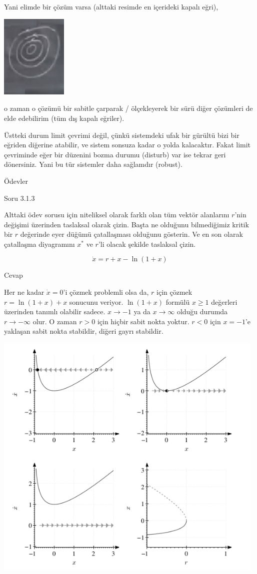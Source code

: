 \documentclass[12pt,fleqn]{article}\usepackage{../../common}
\begin{document}
Yani elimde bir çözüm varsa (alttaki resimde en içerideki kapalı eğri), 

\includegraphics[height=4cm]{08_40.png}

o zaman o çözümü bir sabitle çarparak / ölçekleyerek bir sürü diğer çözümleri de
elde edebilirim (tüm dış kapalı eğriler).

Üstteki durum limit çevrimi değil, çünkü sistemdeki ufak bir gürültü bizi bir
eğriden diğerine atabilir, ve sistem sonsuza kadar o yolda kalacaktır. Fakat
limit çevriminde eğer bir düzenini bozma durumu (disturb) var ise tekrar geri
dönersiniz. Yani bu tür sistemler daha sağlamdır (robust).

Ödevler

Soru 3.1.3

Alttaki ödev sorusu için niteliksel olarak farklı olan tüm vektör alanlarını
$r$'nin değişimi üzerinden taslaksal olarak çizin. Başta ne olduğunu
bilmediğimiz kritik bir $r$ değerinde eyer düğümü çatallaşması olduğunu
gösterin. Ve en son olarak çatallaşma diyagramını $x^\ast$ ve $r$'li olacak şekilde
taslaksal çizin.

$$ \dot{x} = r + x - \ln(1+x) $$

Cevap

Her ne kadar $\dot{x}=0$'i çözmek problemli olsa da, $r$ için çözmek
$r=\ln(1+x)+x$ sonucunu veriyor. $\ln(1+x)$ formülü $x \ge 1$ değerleri
üzerinden tanımlı olabilir sadece. $x \to -1$ ya da $x \to \infty$ olduğu
durumda $r \to -\infty$ olur. O zaman $r>0$ için hiçbir sabit nokta
yoktur. $r<0$ için $x=-1$'e yaklaşan sabit nokta stabildir, diğeri gayrı
stabildir.

\includegraphics[height=12cm]{08_01.png}
\end{document}

